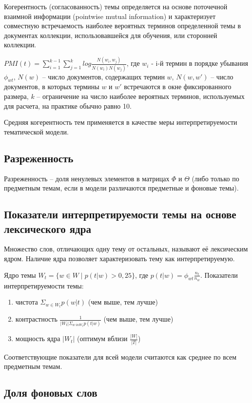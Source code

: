 Когерентность (согласованность) темы определяется на основе поточечной взаимной информации (pointwise mutual information) и характеризует совместную встречаемость наиболее вероятных терминов определенной темы в документах коллекции, использовавшейся для обучения, или сторонней коллекции.

$PMI(t) = \sum_{i=1}^{k-1}\sum_{j=1}^{k}log\frac{N(w_i, w_j)}{N(w_i)N(w_j)}$, где $w_i$ - i-й термин в порядке убывания $\phi_{wt}$, $N(w)$ -- число документов, содержащих термин $w$, $N(w, w')$ -- число документов, в которых термины $w$ и $w'$ встречаются в окне фиксированного размера, $k$ -- ограничение на число наиболее вероятных терминов, используемых для расчета, на практике обычно равно 10.

Средняя когерентность тем применяется в качестве меры интерпретируемости тематической модели.

\subsection*{Разреженность}

Разреженность -- доля ненулевых элементов в матрицах $\Phi$ и $\Theta$ (либо только по предметным темам, если в модели различаются предметные и фоновые темы).

\subsection*{Показатели интерпретируемости темы на основе лексического ядра}

Множество слов, отличающих одну тему от остальных, называют её лексическим ядром. Наличие ядра позволяет характеризовать тему как интерпретируемую.

Ядро темы $W_t = \{w \in W \; | \; p(t|w) > 0,25\}$, где $p(t|w) = \phi_{wt}\frac{n_t}{n_w}$. Показатели интерпретируемости темы:
\begin{enumerate}
    \item чистота $\Sigma_{w \in W_t}p(w|t)$ (чем выше, тем лучше)
    \item контрастность $\frac{1}{|W_t|\Sigma_{w \ in W_t}p(t|w)}$ (чем выше, тем лучше)
    \item мощность ядра $|W_t|$ (оптимум вблизи $\frac{|W|}{|T|}$)
\end{enumerate} 

Соответствующие показатели для всей модели считаются как среднее по всем предметным темам.

\subsection*{Доля фоновых слов}

